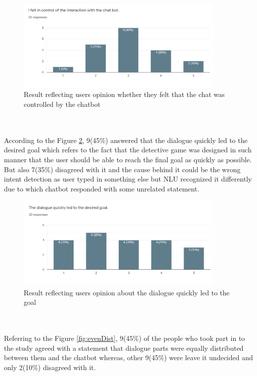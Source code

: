 \begin{figure}[!h]
    \centering
    \includegraphics[width=0.9\textwidth]{img/Chatbot_Control.PNG}
    \caption{Result reflecting users opinion whether they felt that the chat was controlled by the chatbot}
    \label{fig:chatbotControl}
\end{figure}
\\~\\
According to the Figure \ref{fig:quickGoal}, 9(45\%) answered that the dialogue quickly led to the desired goal which refers to the fact that the detective game was designed in such manner that the user should be able to reach the final goal as quickly as possible. But also 7(35\%) disagreed with it and the cause behind it could be the wrong intent detection as user typed in something else but NLU recognized it differently due to which chatbot responded with some unrelated statement.

\begin{figure}[!h]
    \centering
    \includegraphics[width=0.9\textwidth]{img/Quick_Goal.PNG}
    \caption{Result reflecting users opinion about the dialogue quickly led to the goal}
    \label{fig:quickGoal}
\end{figure}
\\~\\
Referring to the Figure \ref{fig:evenDist}, 9(45\%) of the people who took part in to the study agreed with a statement that dialogue parts were equally distributed between them and the chatbot whereas, other 9(45\%) were leave it undecided and only 2(10\%) disagreed with it.

